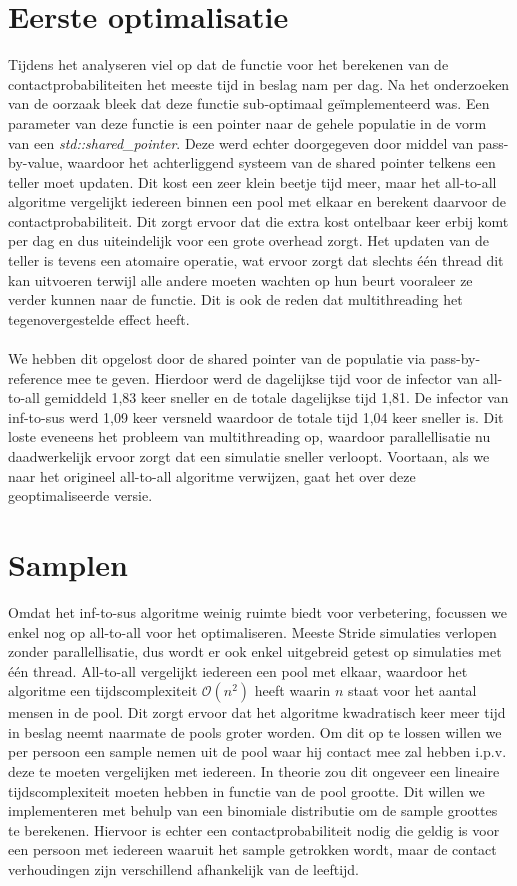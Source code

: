 \begin{appendices}
\section{Eerste optimalisatie}
Tijdens het analyseren viel op dat de functie voor het berekenen van de contactprobabiliteiten het meeste tijd in beslag nam per dag. Na het onderzoeken van de oorzaak bleek dat deze functie sub-optimaal geïmplementeerd was. Een parameter van deze functie is een pointer naar de gehele populatie in de vorm van een \textit{std::shared\_pointer}. Deze werd echter doorgegeven door middel van pass-by-value, waardoor het achterliggend systeem van de shared pointer telkens een teller moet updaten. Dit kost een zeer klein beetje tijd meer, maar het all-to-all algoritme vergelijkt iedereen binnen een pool met elkaar en berekent daarvoor de contactprobabiliteit. Dit zorgt ervoor dat die extra kost ontelbaar keer erbij komt per dag en dus uiteindelijk voor een grote overhead zorgt. Het updaten van de teller is tevens een atomaire operatie, wat ervoor zorgt dat slechts één thread dit kan uitvoeren terwijl alle andere moeten wachten op hun beurt vooraleer ze verder kunnen naar de functie. Dit is ook de reden dat multithreading het tegenovergestelde effect heeft.
\\\\
We hebben dit opgelost door de shared pointer van de populatie via pass-by-reference mee te geven. Hierdoor werd de dagelijkse tijd voor de infector van all-to-all gemiddeld 1,83 keer sneller en de totale dagelijkse tijd 1,81. De infector van inf-to-sus werd 1,09 keer versneld waardoor de totale tijd 1,04 keer sneller is. Dit loste eveneens het probleem van multithreading op, waardoor parallellisatie nu daadwerkelijk ervoor zorgt dat een simulatie sneller verloopt. Voortaan, als we naar het origineel all-to-all algoritme verwijzen, gaat het over deze geoptimaliseerde versie.

\section{Samplen}
Omdat het inf-to-sus algoritme weinig ruimte biedt voor verbetering, focussen we enkel nog op all-to-all voor het optimaliseren. Meeste Stride simulaties verlopen zonder parallellisatie, dus wordt er ook enkel uitgebreid getest op simulaties met één thread. All-to-all vergelijkt iedereen een pool met elkaar, waardoor het algoritme een tijdscomplexiteit $\mathcal{O}(n^{2})$ heeft waarin $n$ staat voor het aantal mensen in de pool. Dit zorgt ervoor dat het algoritme kwadratisch keer meer tijd in beslag neemt naarmate de pools groter worden. Om dit op te lossen willen we per persoon een sample nemen uit de pool waar hij contact mee zal hebben i.p.v. deze te moeten vergelijken met iedereen. In theorie zou dit ongeveer een lineaire tijdscomplexiteit moeten hebben in functie van de pool grootte. Dit willen we implementeren met behulp van een binomiale distributie om de sample groottes te berekenen. Hiervoor is echter een contactprobabiliteit nodig die geldig is voor een persoon met iedereen waaruit het sample getrokken wordt, maar de contact verhoudingen zijn verschillend afhankelijk van de leeftijd.


\end{appendices}
